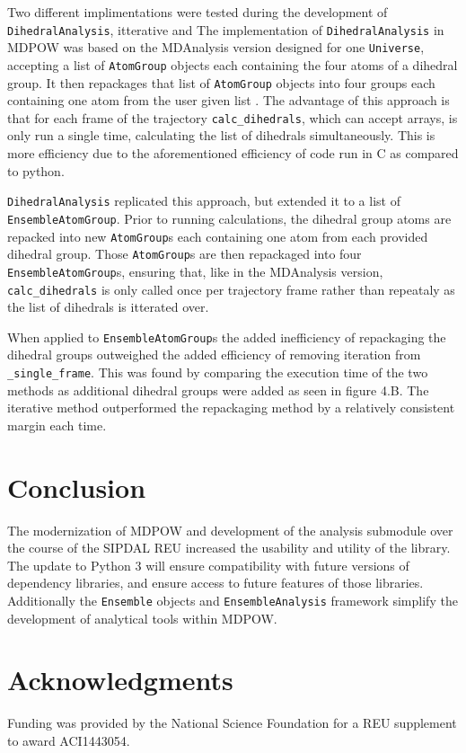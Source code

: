 \documentclass{article}[letterpaper, margins=1in, 12pt]
\begin{document}
Two different implimentations were tested during the development of \texttt{DihedralAnalysis}, itterative and The implementation of \texttt{DihedralAnalysis} in MDPOW was based on the MDAnalysis version designed for one \texttt{Universe}, accepting a list of \texttt{AtomGroup} objects each containing the four atoms of a dihedral group. It then repackages that list of \texttt{AtomGroup} objects into four groups each containing one atom from the user given list \cite{Mull2018}. The advantage of this approach is that for each frame of the trajectory \lstinline{calc_dihedrals}, which can accept arrays, is only run a single time, calculating the list of dihedrals simultaneously. This is more efficiency due to the aforementioned efficiency of code run in C as compared to python.

\texttt{DihedralAnalysis} replicated this approach, but extended it to a list of \texttt{EnsembleAtomGroup}. Prior to running calculations, the dihedral group atoms are repacked into new \texttt{AtomGroup}s each containing one atom from each provided dihedral group. Those \texttt{AtomGroup}s are then repackaged into four \texttt{EnsembleAtomGroup}s, ensuring that, like in the MDAnalysis version, \lstinline{calc_dihedrals} is only called once per trajectory frame rather than repeataly as the list of dihedrals is itterated over.
 
When applied to \texttt{EnsembleAtomGroup}s the added inefficiency of repackaging the dihedral groups outweighed the added efficiency of removing iteration from \lstinline{_single_frame}. This was found by comparing the execution time of the two methods as additional dihedral groups were added as seen in figure 4.B. The iterative method outperformed the repackaging method by a relatively consistent margin each time. 

\section{Conclusion}
The modernization of MDPOW and development of the analysis submodule over the course of the SIPDAL REU increased the usability and utility of the library. The update to Python 3 will ensure compatibility with future versions of dependency libraries, and ensure access to future features of those libraries. Additionally the \texttt{Ensemble} objects and \texttt{EnsembleAnalysis} framework simplify the development of analytical tools within MDPOW.

\section*{Acknowledgments}
Funding was provided by the National Science Foundation for a REU supplement to award ACI1443054. 

\printbibliography
\end{document}
